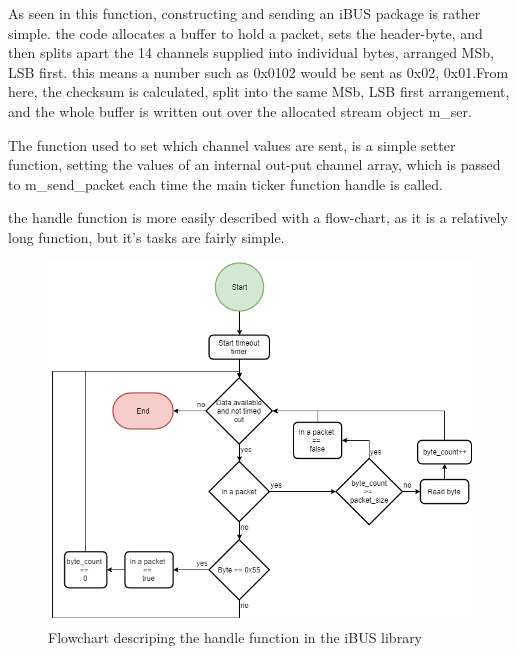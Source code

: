 As seen in this function, constructing and sending an iBUS package is rather simple. the code allocates a buffer to hold a packet, sets the header-byte, and then splits apart the 14 channels supplied into individual bytes, arranged MSb, LSB first. this means a number such as 0x0102 would be sent as 0x02, 0x01.From here, the checksum is calculated, split into the same MSb, LSB first arrangement, and the whole buffer is written out over the allocated stream object m\_ser.

The function used to set which channel values are sent, is a simple setter function, setting the values of an internal out-put channel array, which is passed to m\_send\_packet\(\) each time the main ticker function handle\(\) is called.

the handle function is more easily described with a flow-chart, as it is a relatively long function, but it's tasks are fairly simple.

\begin{figure}[h]
    \centering
    \includegraphics[width=0.8\columnwidth]{figures/ch_design/ibus-handle-flowchart.png}
    \caption{Flowchart descriping the handle function in the iBUS library}
    \label{fig:ibus_handle_flowchart}
\end{figure}

